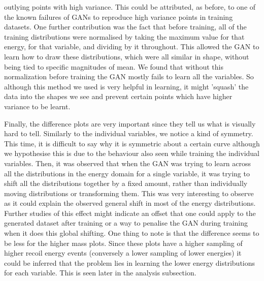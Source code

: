 \documentclass[11pt]{article} %
\begin{document}
outlying points with high variance.
This could be attributed, as before, to one of the known failures of GANs to reproduce high variance points in training datasets.
One further contribution was the fact that before training, all of the training distributions were normalised
by taking the maximum value for that energy, for that variable, and dividing by it throughout.
This allowed the GAN to learn how to draw these distributions, which were all similar in shape, without
being tied to specific magnitudes of mean.
We found that without this normalization before training the GAN mostly fails to learn all the variables.
So although this method we used is very helpful in learning, it might 'squash' the data into the shapes we see and prevent certain points
which have higher variance to be learnt.
\\
\par Finally, the difference plots are very important since they tell us what is visually hard to tell.
Similarly to the individual variables, we notice a kind of symmetry.
This time, it is difficult to say why it is symmetric about a certain curve although we hypothesise
this is due to the behaviour also seen while training the individual variables.
Then, it was observed that when the GAN was trying to learn across all the distributions in the energy domain
for a single variable, it was trying to shift all the distributions together by a fixed amount, rather than individually moving
distributions or transforming them.
This was very interesting to observe as it could explain the observed general shift in most of the energy distributions.
Further studies of this effect might indicate an offset that one could apply to the generated dataset after training
 or a way to penalise the GAN during training when it does this global shifting.
One thing to note is that the difference seems to be less for the higher mass plots.
Since these plots have a higher sampling of higher recoil energy events (conversely a lower sampling of lower energies)
it could be inferred that the problem lies in learning the lower energy distributions for each variable.
This is seen later in the analysis subsection.
\end{document}
